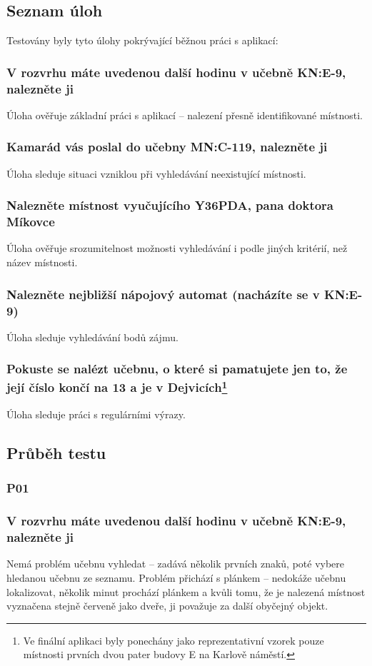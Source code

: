\subsection{Seznam úloh}
Testovány byly tyto úlohy pokrývající běžnou práci s aplikací:
\subsubsection*{V rozvrhu máte uvedenou další hodinu v učebně KN:E-9, nalezněte ji}
Úloha ověřuje základní práci s aplikací -- nalezení přesně identifikované místnosti.
\subsubsection*{Kamarád vás poslal do učebny MN:C-119, nalezněte ji}
Úloha sleduje situaci vzniklou při vyhledávání neexistující místnosti.
\subsubsection*{Nalezněte místnost vyučujícího Y36PDA, pana doktora Míkovce}
Úloha ověřuje srozumitelnost možnosti vyhledávání i podle jiných kritérií, než název místnosti.
\subsubsection*{Nalezněte nejbližší nápojový automat (nacházíte se v KN:E-9)}
Úloha sleduje vyhledávání bodů zájmu.
\subsubsection*{Pokuste se nalézt učebnu, o které si pamatujete jen to, že její číslo končí na 13 a je v Dejvicích\footnote{Ve finální aplikaci byly ponechány jako reprezentativní vzorek pouze místnosti prvních dvou pater budovy E na Karlově náměstí.}}
Úloha sleduje práci s regulárními výrazy.


\subsection{Průběh testu}
\subsubsection{P01}
\subsubsection*{V rozvrhu máte uvedenou další hodinu v učebně KN:E-9, nalezněte ji}
Nemá problém učebnu vyhledat -- zadává několik prvních znaků, poté vybere hledanou učebnu ze seznamu. Problém přichází s plánkem -- nedokáže učebnu lokalizovat, několik minut prochází plánkem a kvůli tomu, že je nalezená místnost vyznačena stejně červeně jako dveře, ji považuje za další obyčejný objekt.
